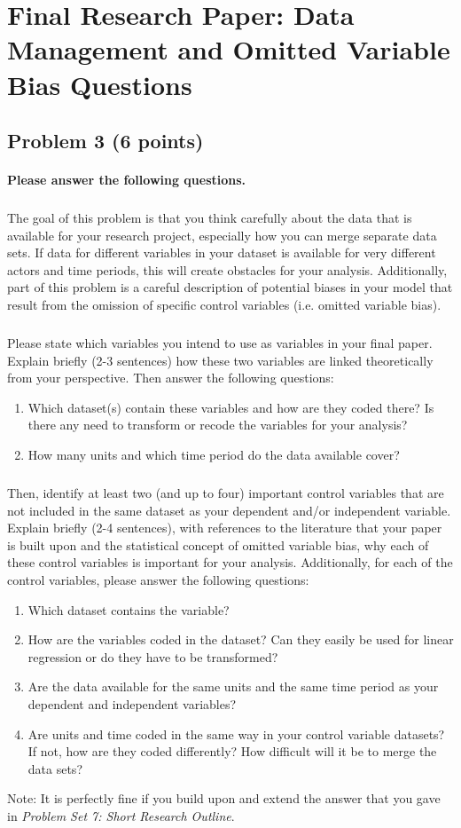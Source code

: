 \documentclass[12pt]{article}
\begin{document}
\section*{Final Research Paper: Data Management and Omitted Variable Bias Questions}

\subsection*{Problem 3 (6 points)}

\paragraph{Please answer the following questions.}

\subparagraph{} The goal of this problem is that you think carefully about the data that is available for your research project, especially how you can merge separate data sets. If data for different variables in your dataset is available for very different actors and time periods, this will create obstacles for your analysis. Additionally, part of this problem is a careful description of potential biases in your model that result from the omission of specific control variables (i.e. omitted variable bias).

\subparagraph{} Please state which variables you intend to use as variables in your final paper. Explain briefly (2-3 sentences) how these two variables are linked theoretically from your perspective. Then answer the following questions:

\begin{enumerate}
	\item Which dataset(s) contain these variables and how are they coded there? Is there any need to transform or recode the variables for your analysis?
	\item How many units and which time period do the data available cover?
\end{enumerate}

\subparagraph{} Then, identify at least two (and up to four) important control variables that are not included in the same dataset as your dependent and/or independent variable. Explain briefly (2-4 sentences), with references to the literature that your paper is built upon and the statistical concept of omitted variable bias, why each of these control variables is important for your analysis. Additionally, for each of the control variables, please answer the following questions:

\begin{enumerate}
	\item Which dataset contains the variable?
	\item How are the variables coded in the dataset? Can they easily be used for linear regression or do they have to be transformed?
	\item Are the data available for the same units and the same time period as your dependent and independent variables?
	\item Are units and time coded in the same way in your control variable datasets? If not, how are they coded differently? How difficult will it be to merge the data sets?
\end{enumerate}

Note: It is perfectly fine if you build upon and extend the answer that you gave in \textit{Problem Set 7: Short Research Outline}.
\end{document}
